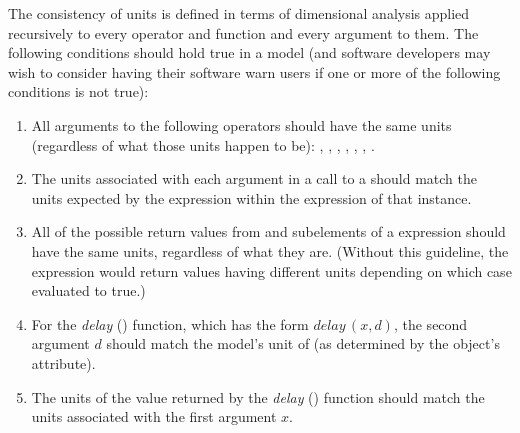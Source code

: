 The consistency of units is defined in terms of dimensional
analysis applied recursively to every operator and function and
every argument to them.  The following conditions should hold true
in a model (and software developers may wish to consider having
their software warn users if one or more of the following
conditions is not true):

\begin{enumerate}

\item All arguments to the following operators should have the same
  units (regardless of what those units happen to be):
  , , ,  ,
  , , .  

\item The units associated with each argument in a call to a
  \FunctionDefinition should match the units expected by the
   expression within the  expression of
  that \FunctionDefinition instance.


\item All of the possible return values from  and
   subelements of a  expression
  should have the same units, regardless of what they are.
  (Without this guideline, the  expression would
  return values having different units depending on which case
  evaluated to true.)  

\item For the \emph{delay} 
  () function, which has the form
  $\textit{delay}\,(x, d)$, the second argument $d$ should match
  the model's unit of  (as determined by the \Model
  object's  attribute).

\item The units of the value returned by the \emph{delay}
   () function
  should match the units associated with the first argument $x$.



\end{enumerate}
